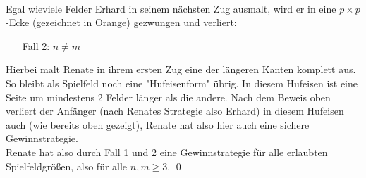 \documentclass[12pt,a4paper,oneside]{article}
\begin{document}
\\
Egal wieviele Felder Erhard in seinem nächsten Zug ausmalt, wird er in eine $p\times p$-Ecke (gezeichnet in Orange) gezwungen und verliert:
\\

\begin{itemize}
	\item[Fall 2:] $n\neq m$
\end{itemize}

Hierbei malt Renate in ihrem ersten Zug eine der längeren Kanten komplett aus. So bleibt als Spielfeld noch eine "Hufeisenform" übrig. In diesem Hufeisen ist eine Seite um mindestens 2 Felder länger als die andere. Nach dem Beweis oben verliert der Anfänger (nach Renates Strategie also Erhard) in diesem Hufeisen auch (wie bereits oben gezeigt), Renate hat also hier auch eine sichere Gewinnstrategie.
\\[10pt]
Renate hat also durch Fall 1 und 2 eine Gewinnstrategie für alle erlaubten Spielfeldgrößen, also für alle $n, m \geq 3$. \qed
\end{document}
